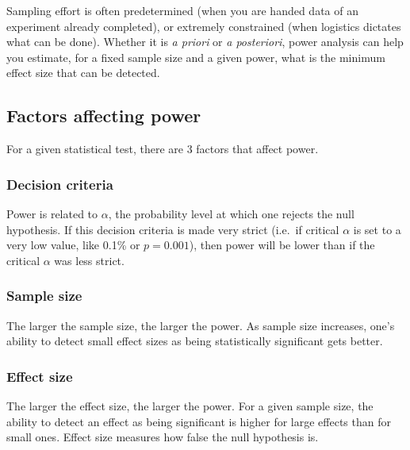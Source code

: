 \documentclass[
  12pt,
]{book}
\begin{document}
Sampling effort is often predetermined (when you are handed data of an experiment already completed), or extremely constrained (when logistics dictates what can be done). Whether it is \emph{a priori} or \emph{a posteriori}, power analysis can help you estimate, for a fixed sample size and a given power, what is the minimum effect size that can be detected.

\hypertarget{factors-affecting-power}{%
\subsection{Factors affecting power}\label{factors-affecting-power}}

For a given statistical test, there are 3 factors that affect power.

\hypertarget{decision-criteria}{%
\subsubsection*{Decision criteria}\label{decision-criteria}}

Power is related to \(\alpha\), the probability level at which one rejects the null hypothesis. If this decision criteria is made very strict (i.e.~if critical \(\alpha\) is set to a very low value, like 0.1\% or \(p = 0.001\)), then power will be lower than if the critical \(\alpha\) was less strict.

\hypertarget{sample-size}{%
\subsubsection*{Sample size}\label{sample-size}}

The larger the sample size, the larger the power. As sample size increases, one's ability to detect small effect sizes as being statistically significant gets better.

\hypertarget{effect-size}{%
\subsubsection*{Effect size}\label{effect-size}}

The larger the effect size, the larger the power. For a given sample size, the ability to detect an effect as being significant is higher for large effects than for small ones. Effect size measures how false the null hypothesis is.
\end{document}
